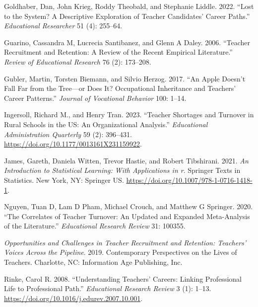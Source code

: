 \documentclass[
]{article}
\newlength{\cslhangindent}
\newlength{\cslentryspacingunit} %
\newenvironment{CSLReferences}[2] %
 {%
  \setlength{\parindent}{0pt}
  \ifodd #1
  \let\oldpar\par
  \def\par{\hangindent=\cslhangindent\oldpar}
  \fi
  \setlength{\parskip}{#2\cslentryspacingunit}
 }%
 {}
\begin{document}
\begin{CSLReferences}{1}{0}
\leavevmode{}%
Goldhaber, Dan, John Krieg, Roddy Theobald, and Stephanie Liddle. 2022. {``Lost to the System? A Descriptive Exploration of Teacher Candidates' Career Paths.''} \emph{Educational Researcher} 51 (4): 255--64.

\leavevmode{}%
Guarino, Cassandra M, Lucrecia Santibanez, and Glenn A Daley. 2006. {``Teacher Recruitment and Retention: A Review of the Recent Empirical Literature.''} \emph{Review of Educational Research} 76 (2): 173--208.

\leavevmode{}%
Gubler, Martin, Torsten Biemann, and Silvio Herzog. 2017. {``An Apple Doesn't Fall Far from the Tree---or Does It? Occupational Inheritance and Teachers' Career Patterns.''} \emph{Journal of Vocational Behavior} 100: 1--14.

\leavevmode{}%
Ingersoll, Richard M., and Henry Tran. 2023. {``Teacher Shortages and Turnover in Rural Schools in the US: An Organizational Analysis.''} \emph{Educational Administration Quarterly} 59 (2): 396--431. \url{https://doi.org/10.1177/0013161X231159922}.

\leavevmode{}%
James, Gareth, Daniela Witten, Trevor Hastie, and Robert Tibshirani. 2021. \emph{An Introduction to Statistical Learning: With Applications in r}. Springer Texts in Statistics. New York, NY: Springer US. \url{https://doi.org/10.1007/978-1-0716-1418-1}.

\leavevmode{}%
Nguyen, Tuan D, Lam D Pham, Michael Crouch, and Matthew G Springer. 2020. {``The Correlates of Teacher Turnover: An Updated and Expanded Meta-Analysis of the Literature.''} \emph{Educational Research Review} 31: 100355.

\leavevmode{}%
\emph{Opportunities and Challenges in Teacher Recruitment and Retention: Teachers' Voices Across the Pipeline}. 2019. Contemporary Perspectives on the Lives of Teachers. Charlotte, NC: Information Age Publishing, Inc.

\leavevmode{}%
Rinke, Carol R. 2008. {``Understanding Teachers' Careers: Linking Professional Life to Professional Path.''} \emph{Educational Research Review} 3 (1): 1--13. \url{https://doi.org/10.1016/j.edurev.2007.10.001}.


\end{CSLReferences}
\end{document}
